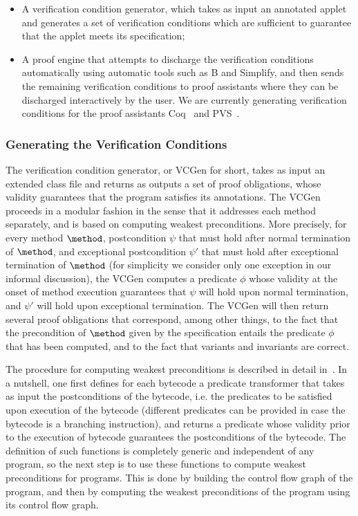 \begin{itemize}
\item A verification condition generator, which takes as input an annotated
applet and generates a set of verification conditions which are sufficient
to guarantee that the applet meets its specification;

\item A proof engine that attempts to discharge the verification
conditions automatically using automatic tools such as B and Simplify,
and then sends the remaining verification conditions to proof assistants
where they can be discharged interactively by the user.  We are
currently generating verification conditions for the proof assistants
Coq~\cite{coq} and PVS~\cite{pvs}.
\end{itemize}


\subsubsection{Generating the Verification Conditions}\label{subsec:verification}
The verification condition generator, or VCGen for short, takes as
input an extended class file and returns as outputs a set of proof
obligations, whose validity guarantees that the program satisfies its
annotations. The VCGen proceeds in a modular fashion in the sense that
it addresses each method separately, and is based on computing weakest
preconditions. More precisely, for every method
$\method$, postcondition $\psi$ that must hold after normal
termination of $\method$, and exceptional postcondition $\psi'$ that
must hold after exceptional termination of $\method$ (for simplicity
we consider only one exception in our informal discussion), the VCGen computes a predicate $\phi$ whose validity at the onset of method
execution guarantees that $\psi$ will hold upon normal termination,
and $\psi'$ will hold upon exceptional termination. The VCGen will
then return several proof obligations that correspond, among other
things, to the fact that the precondition of $\method$ given by the
specification entails the predicate $\phi$ that has been computed, and
to the fact that variants and invariants are correct.


The procedure for computing weakest preconditions is described in
detail in~\cite{LM05:acc}. In a nutshell, one first defines for each
bytecode a predicate transformer that takes as input the
postconditions of the bytecode, i.e. the predicates to be satisfied
upon execution of the bytecode (different predicates can be provided
in case the bytecode is a branching instruction), and returns a
predicate whose validity prior to the execution of bytecode guarantees
the postconditions of the bytecode. The definition of such functions is
completely generic and independent of any program, so the next step is
to use these functions to compute weakest preconditions for programs.
This is done by building the control flow graph of the program, and then
by computing the weakest preconditions of the program using its control
flow graph.

